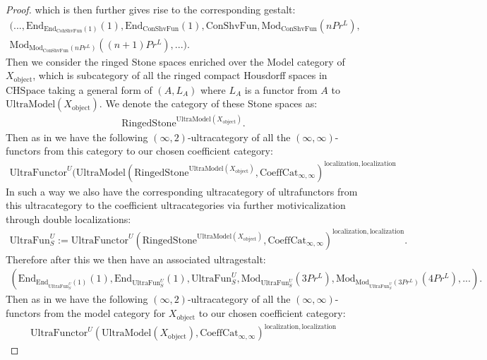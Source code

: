 \documentclass[12pt]{article}
\theoremstyle{definition}
\begin{document}
\begin{proof}
which is then further gives rise to the corresponding gestalt:
\begin{align}
(...,\mathrm{End}_{\mathrm{End}_{\mathrm{CohShvFun}}(1)}(1),\mathrm{End}_{\mathrm{ConShvFun}}(1),\mathrm{ConShvFun},\mathrm{Mod}_{\mathrm{ConShvFun}}(nPr^L),\\
\mathrm{Mod}_{\mathrm{Mod}_{\mathrm{ConShvFun}}(nPr^L)}((n+1)Pr^L),...).
\end{align}
Then we consider the ringed Stone spaces enriched over the Model category of $X_\mathrm{object}$, which is subcategory of all the ringed compact Housdorff spaces in $\mathrm{CHSpace}$ taking a general form of $(A,L_A)$ where $L_A$ is a functor from $A$ to $\mathrm{UltraModel}(X_\mathrm{object})$. We denote the category of these Stone spaces as:
\begin{align}
\mathrm{RingedStone}^{\mathrm{UltraModel}(X_\mathrm{object})}.
\end{align}  
Then as in \cite{5Lu3} we have the following $(\infty,2)$-ultracategory of all the $(\infty,\infty)$-functors from this category to our chosen coefficient category:
\begin{align}
\mathrm{UltraFunctor}^U(\mathrm{UltraModel}(\mathrm{RingedStone}^{\mathrm{UltraModel}(X_\mathrm{object})},\mathrm{CoeffCat}_{\infty,\infty})^{\mathrm{localization}, \mathrm{localization}}
\end{align}
In such a way we also have the corresponding ultracategory of ultrafunctors from this ultracategory to the coefficient ultracategories via further motivicalization through double localizations:
\begin{align}
\mathrm{UltraFun}_S^U:=\mathrm{UltraFunctor}^U(\mathrm{RingedStone}^{\mathrm{UltraModel}(X_\mathrm{object})},\mathrm{CoeffCat}_{\infty,\infty})^{\mathrm{localization}, \mathrm{localization}}.
\end{align}
Therefore after this we then have an associated ultragestalt:
\begin{align}
(\mathrm{End}_{\mathrm{End}_{\mathrm{UltraFun}_S^U}(1)}(1),\mathrm{End}_{\mathrm{UltraFun}_S^U}(1),\mathrm{UltraFun}_S^U,\mathrm{Mod}_{\mathrm{UltraFun}_S^U}(3Pr^L),\mathrm{Mod}_{\mathrm{Mod}_{\mathrm{UltraFun}_S^U}(3Pr^L)}(4Pr^L),...).
\end{align}
Then as in \cite{5Lu3} we have the following $(\infty,2)$-ultracategory of all the $(\infty,\infty)$-functors from the model category for $X_\mathrm{object}$ to our chosen coefficient category:
\begin{align}
\mathrm{UltraFunctor}^U(\mathrm{UltraModel}(X_\mathrm{object}),\mathrm{CoeffCat}_{\infty,\infty})^{\mathrm{localization}, \mathrm{localization}}

\end{align}
\end{proof}
\end{document}
